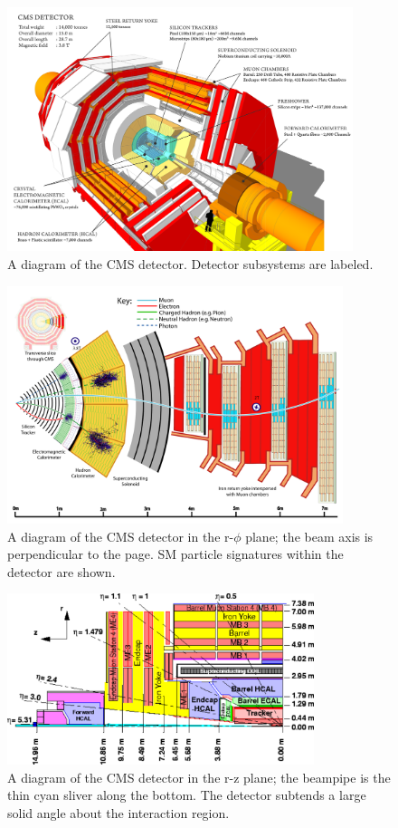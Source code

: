 \begin{figure}[hb!]
\centering
\includegraphics[width=0.9\textwidth]{figs/howcmsworks.png}
\caption{A diagram of the CMS detector. Detector subsystems are labeled.}
\label{fig:howcmsworks}
\end{figure}

\begin{figure}[hb!]
\centering
\includegraphics[width=0.875\textwidth]{figs/CMS-PRF-14-001_Figure_001.pdf}
\caption{A diagram of the CMS detector in the r-$\phi$ plane; the beam axis is perpendicular to the page. SM particle signatures within the detector are shown.}
\label{fig:schematicview}
\end{figure}

\begin{figure}[hb!]
\centering
\includegraphics[width=0.8\textwidth]{figs/img41.pdf}
\caption{A diagram of the CMS detector in the r-z plane; the beampipe is the thin cyan sliver along the bottom. The detector subtends a large solid angle about the interaction region.}
\label{fig:detectoreta}
\end{figure}

